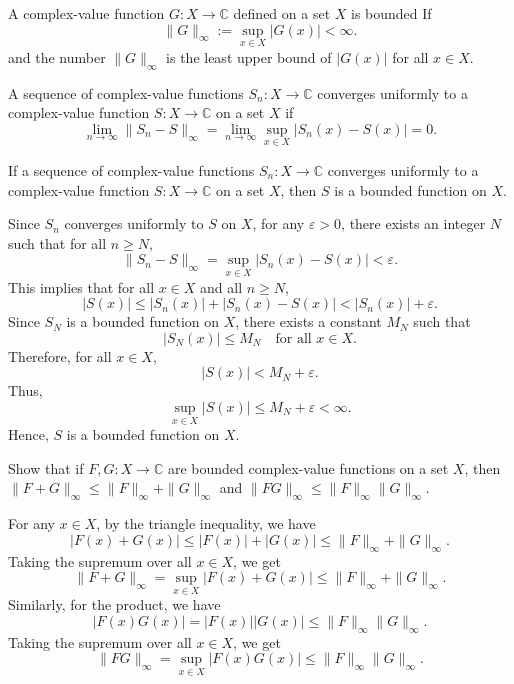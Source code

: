 \documentclass{elegantbook}
\begin{document}
\begin{definition}
  A complex-value function $G:X\to\mathbb{C}$ defined on a set $X$ is bounded If
  \[
    \|G\|_{\infty} := \sup_{x \in X} |G(x)| < \infty.
  \]
  and the number $\|G\|_{\infty}$ is the least upper bound of $|G(x)|$ for all $x \in X$.
\end{definition}

\begin{definition}
  A sequence of complex-value functions $S_n:X\to\mathbb{C}$ converges uniformly to a complex-value function $S:X\to\mathbb{C}$ on a set $X$ if
  \[
    \lim_{n \to \infty} \|S_n - S\|_{\infty} = \lim_{n \to \infty} \sup_{x \in X} |S_n(x) - S(x)| = 0.
  \]
\end{definition}

\begin{exercise} \label{ex:uniform_limit_bounded}
  If a sequence of complex-value functions $S_n:X\to\mathbb{C}$ converges uniformly to a complex-value function $S:X\to\mathbb{C}$ on a set $X$, then $S$ is a bounded function on $X$.
\end{exercise}

\begin{solution}
  Since $S_n$ converges uniformly to $S$ on $X$, for any $\varepsilon > 0$, there exists an integer $N$ such that for all $n \geq N$,
  \[
    \|S_n - S\|_{\infty} = \sup_{x \in X} |S_n(x) - S(x)| < \varepsilon.
  \]
  This implies that for all $x \in X$ and all $n \geq N$,
  \[
    |S(x)| \leq |S_n(x)| + |S_n(x) - S(x)| < |S_n(x)| + \varepsilon.
  \]
  Since $S_N$ is a bounded function on $X$, there exists a constant $M_N$ such that
  \[
    |S_N(x)| \leq M_N \quad \text{for all } x \in X.
  \]
  Therefore, for all $x \in X$,
  \[
    |S(x)| < M_N + \varepsilon.
  \]
  Thus,
  \[
    \sup_{x \in X} |S(x)| \leq M_N + \varepsilon < \infty.
  \]
  Hence, $S$ is a bounded function on $X$.
\end{solution}

\begin{exercise} \label{ex:infinity_norm_properties}
  Show that if $F,G:X\to\mathbb{C}$ are bounded complex-value functions on a set $X$, then $\|F+G\|_{\infty} \leq \|F\|_{\infty} + \|G\|_{\infty}$ and $\|FG\|_{\infty} \leq \|F\|_{\infty} \|G\|_{\infty}$.
\end{exercise}

\begin{solution}
  For any $x \in X$, by the triangle inequality, we have
  \[
    |F(x) + G(x)| \leq |F(x)| + |G(x)| \leq \|F\|_{\infty} + \|G\|_{\infty}.
  \]
  Taking the supremum over all $x \in X$, we get
  \[
    \|F + G\|_{\infty} = \sup_{x \in X} |F(x) + G(x)| \leq \|F\|_{\infty} + \|G\|_{\infty}.
  \]
  Similarly, for the product, we have
  \[
    |F(x) G(x)| = |F(x)| |G(x)| \leq \|F\|_{\infty} \|G\|_{\infty}.
  \]
  Taking the supremum over all $x \in X$, we get
  \[
    \|FG\|_{\infty} = \sup_{x \in X} |F(x) G(x)| \leq \|F\|_{\infty} \|G\|_{\infty}.
  \]
\end{solution}
\end{document}
